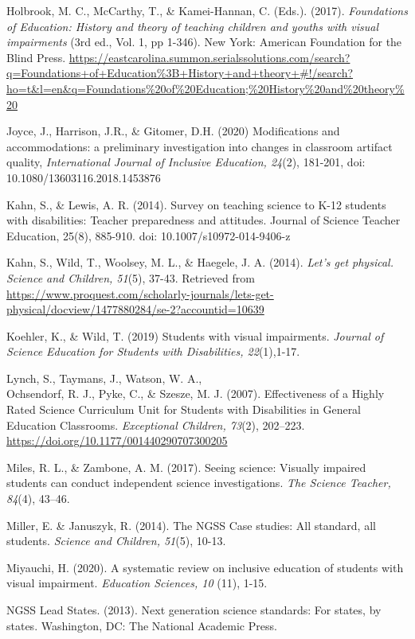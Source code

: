 \documentclass[11.5pt]{sig-alternate}
\begin{document}
\begin{large}
Holbrook, M. C., McCarthy, T., \& Kamei-Hannan, C. (Eds.). (2017). \textit{Foundations of Education: History and theory of teaching children and youths with visual impairments }(3rd ed., Vol. 1, pp 1-346). New York: American Foundation for the Blind Press. \url{https://eastcarolina.summon.serialssolutions.com/search?q=Foundations+of+Education%3B+History+and+theory+#!/search?ho=t&l=en&q=Foundations%20of%20Education;%20History%20and%20theory%20}

Joyce, J.,  Harrison, J.R., \& Gitomer, D.H. (2020) Modifications and accommodations: a preliminary investigation into changes in classroom artifact quality, \textit{International Journal of Inclusive Education, 24}(2), 181-201, doi: 10.1080/13603116.2018.1453876

Kahn, S., \& Lewis, A. R. (2014). Survey on teaching science to K-12 students with disabilities: Teacher preparedness and attitudes. Journal of Science Teacher Education, 25(8), 885-910. doi: 10.1007/s10972-014-9406-z

Kahn, S., Wild, T., Woolsey, M. L., \& Haegele, J. A. (2014).\textit{ Let's get physical. Science and Children, 51}(5), 37-43. Retrieved from \url{https://www.proquest.com/scholarly-journals/lets-get-physical/docview/1477880284/se-2?accountid=10639}

Koehler, K., \& Wild, T. (2019) Students with visual impairments. \textit{Journal of Science Education for Students with Disabilities, 22}(1),1-17.

Lynch, S., Taymans, J., Watson, W. A., \\Ochsendorf, R. J., Pyke, C., \& Szesze, M. J. (2007). Effectiveness of a Highly Rated Science Curriculum Unit for Students with Disabilities in General Education Classrooms. \textit{Exceptional Children, 73}(2), 202–223. \url{https://doi.org/10.1177/001440290707300205}

Miles, R. L., \& Zambone, A. M. (2017). Seeing science: Visually impaired students can conduct independent science investigations. \textit{The Science Teacher, 84}(4), 43–46.

Miller, E. \& Januszyk, R. (2014). The NGSS Case studies: All standard, all students. \textit{Science and Children, 51}(5), 10-13.

Miyauchi, H. (2020). A systematic review on inclusive education of students with visual impairment. \textit{Education Sciences, 10} (11), 1-15.

NGSS Lead States. (2013). Next generation science standards: For states, by states. Washington, DC: The National Academic Press.


\end{large}
\end{document}
